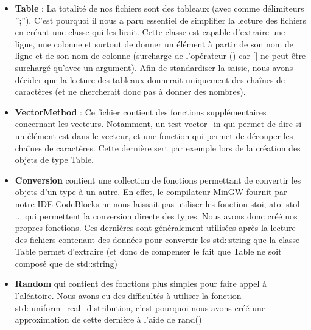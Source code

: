\documentclass[a4paper,twoside, openany,11pt]{book}
\begin{document}
\begin{itemize}
\item \textbf{Table }: La totalité de nos fichiers sont des tableaux (avec comme délimiteurs '';''). C'est pourquoi il nous a paru essentiel de simplifier la lecture des fichiers en créant une classe qui les lirait. Cette classe est capable d'extraire une ligne, une colonne et surtout de donner un élément à partir de son nom de ligne et de son nom de colonne (surcharge de l'opérateur () car [] ne peut être surchargé qu'avec un argument). Afin de standardiser la saisie, nous avons décider que la lecture des tableaux donnerait uniquement des chaînes de caractères (et ne chercherait donc pas à donner des nombres). 
\item \textbf{VectorMethod} : Ce fichier contient des fonctions supplémentaires concernant les vecteurs. Notamment, un test vector\_in qui permet de dire si un élément est dans le vecteur, et une fonction qui permet de découper les chaînes de caractères. Cette dernière sert par exemple lors de la création des objets de type Table. 
\item \textbf{Conversion} contient une collection de fonctions permettant de convertir les objets d'un type à un autre. En effet, le compilateur MinGW fournit par notre IDE CodeBlocks ne nous laissait pas utiliser les fonction stoi, atoi stol ... qui permettent la conversion directe des types. Nous avons donc créé nos propres fonctions. Ces dernières sont généralement utilisées après la lecture des fichiers contenant des données pour convertir les std::string que la classe Table permet d'extraire (et donc de compenser le fait que Table ne soit composé que de std::string)

\item \textbf{Random} qui contient des fonctions plus simples pour faire appel à l'aléatoire. Nous avons eu des difficultés à utiliser la fonction std::uniform\_real\_distribution, c'est pourquoi nous avons créé une approximation de cette dernière à l'aide de rand()


\end{itemize}
\end{document}
